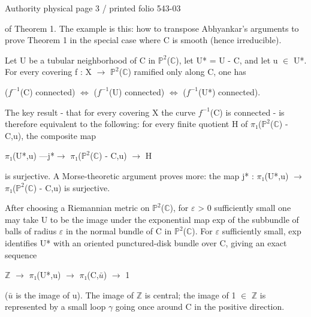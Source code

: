 \documentclass[10pt,a4paper]{article}
\begin{document}
\noindent\begin{adjustbox}{max totalsize={\textwidth}{0.945\textheight},center}
\begin{minipage}{\textwidth}
\noindent\hfill\scriptsize Authority physical page 3 / printed folio 543-03\par\normalsize
\noindent of Theorem 1. The example is this: how to transpose Abhyankar's arguments to prove Theorem 1 in the special case where C is smooth (hence irreducible).\par\smallskip
\noindent Let U be a tubular neighborhood of C in \ensuremath{ℙ^2}(\ensuremath{ℂ}), let U* = U - C, and let u \ensuremath{∈} U*. For every covering f : X \ensuremath{→} \ensuremath{ℙ^2}(\ensuremath{ℂ}) ramified only along C, one has\par\smallskip
\noindent (\ensuremath{f^{-1}}(C) connected) \ensuremath{⇔} (\ensuremath{f^{-1}}(U) connected) \ensuremath{⇔} (\ensuremath{f^{-1}}(U*) connected).\par\smallskip
\noindent The key result - that for every covering X the curve \ensuremath{f^{-1}}(C) is connected - is therefore equivalent to the following: for every finite quotient H of \ensuremath{π₁}(\ensuremath{ℙ^2}(\ensuremath{ℂ}) - C,u), the composite map\par\smallskip
\noindent \ensuremath{π₁}(U*,u) —j*\ensuremath{→} \ensuremath{π₁}(\ensuremath{ℙ^2}(\ensuremath{ℂ}) - C,u) \ensuremath{→} H\par\smallskip
\noindent is surjective. A Morse-theoretic argument proves more: the map j* : \ensuremath{π₁}(U*,u) \ensuremath{→} \ensuremath{π₁}(\ensuremath{ℙ^2}(\ensuremath{ℂ}) - C,u) is surjective.\par\smallskip
\noindent After choosing a Riemannian metric on \ensuremath{ℙ^2}(\ensuremath{ℂ}), for \ensuremath{ε} > 0 sufficiently small one may take U to be the image under the exponential map exp of the subbundle of balls of radius \ensuremath{ε} in the normal bundle of C in \ensuremath{ℙ^2}(\ensuremath{ℂ}). For \ensuremath{ε} sufficiently small, exp identifies U* with an oriented punctured-disk bundle over C, giving an exact sequence\par\smallskip
\noindent \ensuremath{ℤ} \ensuremath{→} \ensuremath{π₁}(U*,u) \ensuremath{→} \ensuremath{π₁}(C,\ensuremath{\bar{u}}) \ensuremath{→} 1\par\smallskip
\noindent (\ensuremath{\bar{u}} is the image of u). The image of \ensuremath{ℤ} is central; the image of 1 \ensuremath{∈} \ensuremath{ℤ} is represented by a small loop \ensuremath{γ} going once around C in the positive direction.\par\smallskip

\end{minipage}
\end{adjustbox}
\end{document}
